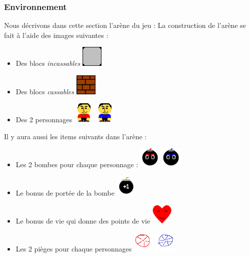 \documentclass[a4paper,11pt,french]{article}
\begin{document}
\subsubsection{Environnement}
Nous décrivons dans cette section l'arène du jeu :
La construction de l'arène se fait à l'aide des images suivantes :
\begin{itemize}
\item Des blocs \textit{incassables} %
\includegraphics[width=1cm,angle=0]{../blocs}
\item Des blocs \textit{cassables} %
\includegraphics[width=1cm,angle=0]{../briques}
\item Des  2 personnages  %
\includegraphics[width=1cm,angle=0]{../joueur1}
\includegraphics[width=1cm,angle=0]{../joueur2}
\end{itemize}
Il y aura aussi les items suivants dans l'arène :
\begin{itemize}
\item Les 2 bombes pour chaque personnage :
\includegraphics[width=1cm,angle=0]{../bomberouge}
\includegraphics[width=1cm,angle=0]{../bombebleue}
\item Le bonus de portée de la bombe
\includegraphics[width=1cm,angle=0]{../bonusbombe}
\item Le bonus de vie qui donne des points de vie 
\includegraphics[width=1cm,angle=0]{../vie}
\item Les 2 pièges pour chaque personnages
\includegraphics[width=1cm,angle=0]{../trap1}
\includegraphics[width=1cm,angle=0]{../trap2}
\end{itemize}
\end{document}
